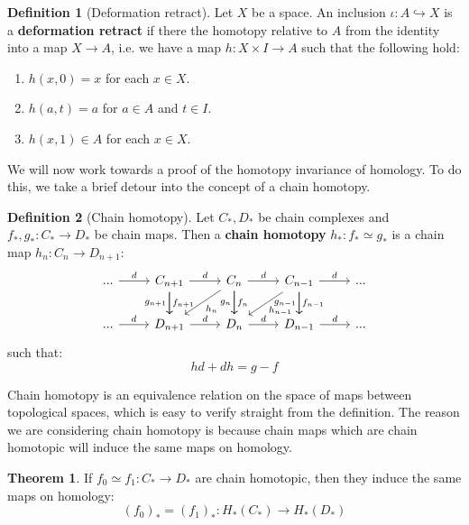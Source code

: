 \documentclass[11pt, oneside]{amsart}   	%
\theoremstyle{definition}
\newtheorem{definition}{Definition}[section]
\newtheorem{theorem}{Theorem}[section]
\begin{document}
\begin{definition}[Deformation retract]
	Let $X$ be a space. An inclusion $\iota : A\hookrightarrow X$ is a \textbf{deformation retract} if there the homotopy 
	relative to $A$ from the identity into a map $X\rightarrow A$, i.e. we have a map $h : X\times I\rightarrow A$ such that 
	the following hold:
	\begin{enumerate}
		\item $h(x, 0) = x$ for each $x\in X$.
		\item $h(a, t) = a$ for $a\in A$ and $t\in I$.
		\item $h(x, 1)\in A$ for each $x\in X$. 
	\end{enumerate}
\end{definition}

We will now work towards a proof of the homotopy invariance of homology. To do this, we take a brief detour into the concept 
of a chain homotopy.

\begin{definition}[Chain homotopy]
	Let $C_*, D_*$ be chain complexes and $f_*, g_* : C_*\rightarrow D_*$ be chain maps. Then a \textbf{chain homotopy} 
	$h_* : f_*\simeq g_*$ is a chain map $h_n : C_n\rightarrow D_{n + 1}$:
	\begin{equation}\begin{tikzcd}
	...\arrow[r, "d"] & C_{n + 1}\arrow[r, "d"]\arrow[d, "f_{n + 1}"]\arrow[d, swap, "g_{n + 1}"] & C_n\arrow[r, "d"]\arrow[d, "f_n"]
	\arrow[d, swap, "g_n"]\arrow[ld, "h_n"] & C_{n - 1}\arrow[r, "d"]\arrow[d, "f_{n - 1}"]\arrow[d, swap, "g_{n - 1}"]\arrow[ld, 
	"h_{n - 1}"] & ... \\
	...\arrow[r, "d"] & D_{n + 1}\arrow[r, "d"] & D_n\arrow[r, "d"] & D_{n - 1}\arrow[r, "d"] & ... 
	\end{tikzcd}\end{equation}
	such that:
	\begin{equation}
		hd + dh = g - f
	\end{equation}
\end{definition}

Chain homotopy is an equivalence relation on the space of maps between topological spaces, which is easy to verify 
straight from the definition. The reason we are considering chain homotopy is because chain maps which are chain 
homotopic will induce the same maps on homology. 

\begin{theorem}
	If $f_0\simeq f_1 : C_*\rightarrow D_*$ are chain homotopic, then they induce the same maps on homology:
	\begin{equation}
		(f_0)_* = (f_1)_* : H_*(C_*)\rightarrow H_*(D_*)
	\end{equation}
\end{theorem}
\end{document}
